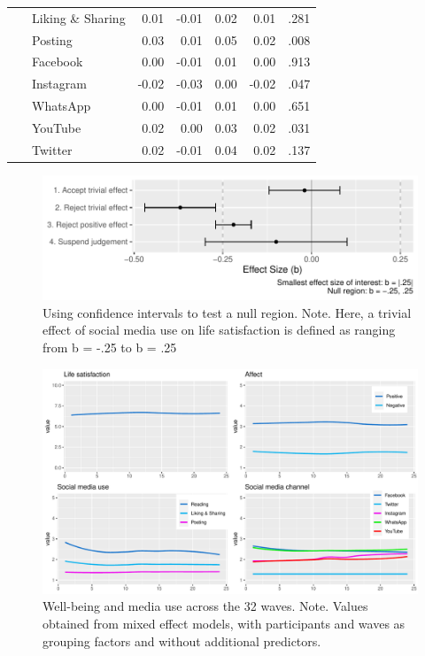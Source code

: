 \documentclass[
  man,mask]{apa7}
\begin{document}
\begin{table}[tbp]
\begin{center}
\begin{threeparttable}
{\begin{tabular}{lrrrrr}
\ \ \ Liking \& Sharing & 0.01 & -0.01 & 0.02 & 0.01 & .281\\
\ \ \ Posting & 0.03 & 0.01 & 0.05 & 0.02 & .008\\
\ \ \ Facebook & 0.00 & -0.01 & 0.01 & 0.00 & .913\\
\ \ \ Instagram & -0.02 & -0.03 & 0.00 & -0.02 & .047\\
\ \ \ WhatsApp & 0.00 & -0.01 & 0.01 & 0.00 & .651\\
\ \ \ YouTube & 0.02 & 0.00 & 0.03 & 0.02 & .031\\
\ \ \ Twitter & 0.02 & -0.01 & 0.04 & 0.02 & .137\\
\bottomrule
\end{tabular}

}

\end{threeparttable}
\end{center}

\end{table}

\newpage

\begin{figure}
\centering
\includegraphics{manuscript_files/figure-latex/sesoi-1.pdf}
\caption{\label{fig:sesoi}Using confidence intervals to test a null region. Note. Here, a trivial effect of social media use on life satisfaction is defined as ranging from b = -.25 to b = .25}
\end{figure}

\newpage

\begin{figure}
\includegraphics[width=\textwidth]{figures/fig_descriptives} \caption{Well-being and media use across the 32 waves. Note. Values obtained from mixed effect models, with participants and waves as grouping factors and without additional predictors.}\label{fig:fig-descriptives}
\end{figure}
\end{document}
